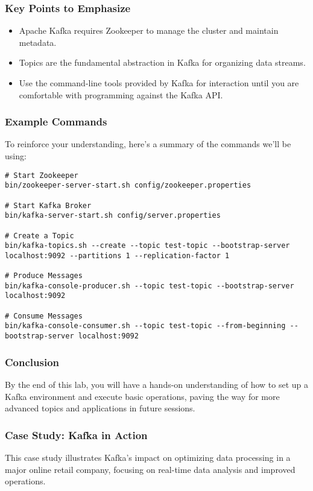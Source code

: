 \documentclass[aspectratio=169]{beamer}
\begin{document}
\begin{frame}[fragile]
    \frametitle{Key Points to Emphasize}
    \begin{itemize}
        \item Apache Kafka requires Zookeeper to manage the cluster and maintain metadata.
        \item Topics are the fundamental abstraction in Kafka for organizing data streams.
        \item Use the command-line tools provided by Kafka for interaction until you are comfortable with programming against the Kafka API.
    \end{itemize}
\end{frame}

\begin{frame}[fragile]
    \frametitle{Example Commands}
    To reinforce your understanding, here’s a summary of the commands we'll be using:
    \begin{lstlisting}
# Start Zookeeper
bin/zookeeper-server-start.sh config/zookeeper.properties

# Start Kafka Broker
bin/kafka-server-start.sh config/server.properties

# Create a Topic
bin/kafka-topics.sh --create --topic test-topic --bootstrap-server localhost:9092 --partitions 1 --replication-factor 1

# Produce Messages
bin/kafka-console-producer.sh --topic test-topic --bootstrap-server localhost:9092

# Consume Messages
bin/kafka-console-consumer.sh --topic test-topic --from-beginning --bootstrap-server localhost:9092
    \end{lstlisting}
\end{frame}

\begin{frame}[fragile]
    \frametitle{Conclusion}
    By the end of this lab, you will have a hands-on understanding of how to set up a Kafka environment and execute basic operations, paving the way for more advanced topics and applications in future sessions.
\end{frame}

\begin{frame}
  \frametitle{Case Study: Kafka in Action}
  This case study illustrates Kafka's impact on optimizing data processing in a major online retail company, focusing on real-time data analysis and improved operations.
\end{frame}
\end{document}
